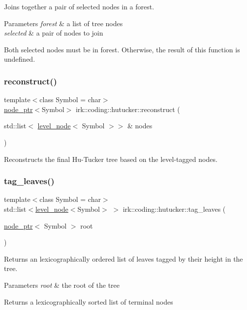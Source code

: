 Joins together a pair of selected nodes in a forest. 


\begin{DoxyParams}{Parameters}
{\em forest} & a list of tree nodes \\
\hline
{\em selected} & a pair of nodes to join\\
\hline
\end{DoxyParams}
Both {\ttfamily selected} nodes must be in {\ttfamily forest}. Otherwise, the result of this function is undefined. \mbox{\label{namespaceirk_1_1coding_1_1hutucker_adf2fb7ba2277edb34df80da2766493f8}} 
\subsubsection{\texorpdfstring{reconstruct()}{reconstruct()}}
{\footnotesize\ttfamily template$<$class Symbol  = char$>$ \\
\mbox{\hyperlink{namespaceirk_1_1coding_1_1hutucker_aa5d22cfdf05ffec38f2531e0307248fe}{node\+\_\+ptr}}$<$Symbol$>$ irk\+::coding\+::hutucker\+::reconstruct (\begin{DoxyParamCaption}\item[{std\+::list$<$ \mbox{\hyperlink{structirk_1_1coding_1_1hutucker_1_1level__node}{level\+\_\+node}}$<$ Symbol $>$$>$ \&}]{nodes }\end{DoxyParamCaption})}



Reconstructs the final Hu-\/\+Tucker tree based on the level-\/tagged nodes. 

\mbox{\label{namespaceirk_1_1coding_1_1hutucker_ab9d1b71846f97891dc2d3f262f5e73ec}} 
\subsubsection{\texorpdfstring{tag\+\_\+leaves()}{tag\_leaves()}}
{\footnotesize\ttfamily template$<$class Symbol  = char$>$ \\
std\+::list$<$\mbox{\hyperlink{structirk_1_1coding_1_1hutucker_1_1level__node}{level\+\_\+node}}$<$Symbol$>$ $>$ irk\+::coding\+::hutucker\+::tag\+\_\+leaves (\begin{DoxyParamCaption}\item[{\mbox{\hyperlink{namespaceirk_1_1coding_1_1hutucker_aa5d22cfdf05ffec38f2531e0307248fe}{node\+\_\+ptr}}$<$ Symbol $>$}]{root }\end{DoxyParamCaption})}

Returns an lexicographically ordered list of leaves tagged by their height in the tree. ~\newline



\begin{DoxyParams}{Parameters}
{\em root} & the root of the tree \\
\hline
\end{DoxyParams}
\begin{DoxyReturn}{Returns}
a lexicographically sorted list of terminal nodes 
\end{DoxyReturn}
